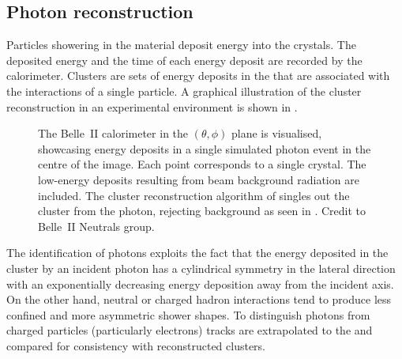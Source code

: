 \subsection{Photon reconstruction}\label{sec:neutrals}

Particles showering in the \ECL material deposit energy into the \ECL crystals.
The deposited energy and the time of each energy deposit are recorded by the calorimeter.
Clusters are sets of energy deposits in the \ECL that are associated with the interactions of a single particle.
A graphical illustration of the cluster reconstruction in an experimental environment is shown in .
\begin{figure}[htbp!]
    \centering
    \caption{\label{fig:clustering}
    The Belle~II calorimeter in the $(\theta,\phi)$ plane is visualised, 
    showcasing energy deposits in a single simulated photon event in the centre of the image.
    Each point corresponds to a single \ECL crystal.
    The low-energy deposits resulting from beam background radiation are included.
    The cluster reconstruction algorithm of \basftwo singles out the cluster from the photon, 
    rejecting background as seen in .
    Credit to Belle~II Neutrals group.
    }
\end{figure}

The identification of photons exploits the fact that the energy deposited in the cluster
by an incident photon has a cylindrical symmetry in the lateral direction with an exponentially decreasing energy deposition away from the incident axis.
On the other hand, neutral or charged hadron interactions tend to produce less confined and more asymmetric shower shapes.
To distinguish photons from charged particles (particularly electrons) tracks are extrapolated to the \ECL and compared for consistency with reconstructed clusters.
